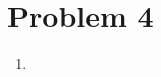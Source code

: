 \documentclass[11pt,letterpaper]{article}
\begin{document}
\begin{enumerate}[label=(\alph*)]
\end{enumerate}


\section*{Problem 4}
\begin{enumerate}[label=(\alph*)]
    \item 
\end{enumerate}
\end{document}
